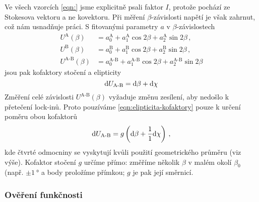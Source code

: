 Ve všech vzorcích \eqref{eqn:} jsme explicitně psali faktor $I$, protože pochází ze Stokesova vektoru a ne kovektoru.
Při měření $\beta$-závislosti napětí je však zahrnut, což nám usnadňuje práci.
S fitovanými parametry $a$ v $\beta$-závislostech
\begin{align}
    U^\textrm{A}(\beta) &= a^\textrm{A}_0 + a^\textrm{A}_1 \cos2\beta + a^\textrm{A}_2 \sin2\beta \,,\\
    U^\textrm{B}(\beta) &= a^\textrm{B}_0 + a^\textrm{B}_1 \cos2\beta + a^\textrm{B}_2 \sin2\beta \,,\\
    U^\textrm{A-B}(\beta) &= a^\textrm{A-B}_0 + a^\textrm{A-B}_1 \cos2\beta + a^\textrm{A-B}_2 \sin2\beta
\end{align}
jsou pak kofaktory stočení a elipticity
\begin{equation}
\label{eqn:elipticita-kofaktory}
    \textrm{d}U_\textrm{A-B} = \textrm{d}\beta + \textrm{d}\chi
\end{equation}
Změření celé závislosti $U^\textrm{A-B}(\beta)$ vyžaduje změnu zesílení, aby nedošlo k přetečení lock-inů.
Proto pouzíváme \eqref{eqn:elipticita-kofaktory} pouze k určení poměru obou kofaktorů
\begin{equation}
    \textrm{d}U_\textrm{A-B} = g \left( \textrm{d}\beta + \frac{1}{1}\textrm{d}\chi \right) \,,
\end{equation}
kde čtvrté odmocniny se vyskytují kvůli použití geometrického průměru (viz výše).
Kofaktor stočení $g$ určíme přímo: změříme několik $\beta$ v malém okolí $\beta_0$ (např. $\pm\SI{1}{\degree}$ a body proložíme přímkou; $g$ je pak její směrnicí.

\subsubsection*{Ověření funkčnosti}




